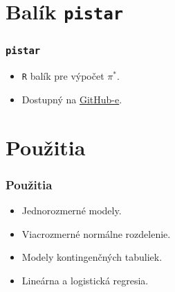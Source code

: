 \documentclass[14pt]{beamer}
\begin{document}
\section{Bal\'ik {\tt pistar}}

\begin{frame}
	\frametitle{{\tt pistar}}
	\begin{itemize}
		\item {\tt R} bal\'ik pre v\'ypo\v{c}et {$\pi^*$}.
		\item Dostupn\'y na \href{https://github.com/jmedzihorsky/pistar}{GitHub-e}.
	\end{itemize}
\end{frame}

\begin{frame}
	\frametitle{\href{http://polberg.ceu.hu/}{ }}
	\begin{center}
		\resizebox{0.75\linewidth}{!}{\itshape {$\pi^*$}}
	\end{center}
\end{frame}








\section{Pou\v{z}itia}


\begin{frame}
	\frametitle{Pou\v{z}itia}
	\begin{itemize}
		\item Jednorozmern\'e modely. 
		\item Viacrozmern\'e norm\'alne rozdelenie.
		\item Modely kontingen\v{c}n\'ych tabuliek. 
		\item Line\'arna a logistick\'a regresia.
	\end{itemize}
\end{frame}
\end{document}
